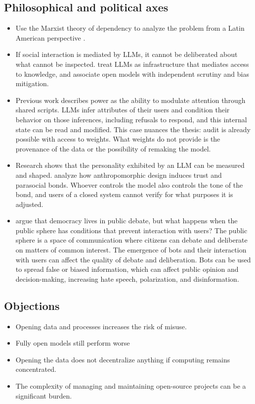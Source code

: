 \documentclass{article}
\begin{document}
\subsection{Philosophical and political axes}
\begin{itemize}
\item Use the Marxist theory of dependency to analyze the problem from a Latin American perspective \textcite{reyes2025pattern}.
\item If social interaction is mediated by LLMs, it cannot be deliberated about what cannot be inspected. \textcite{manchanda2026open} treat LLMs as infrastructure that mediates access to knowledge, and \textcite{machado2025toward} associate open models with independent scrutiny and bias mitigation.
\item Previous work describes power as the ability to modulate attention through shared scripts. LLMs infer attributes of their users and condition their behavior on those inferences, including refusals to respond, and this internal state can be read and modified. This case nuances the thesis: audit is already possible with access to weights. What weights do not provide is the provenance of the data or the possibility of remaking the model.
\item Research shows that the personality exhibited by an LLM can be measured and shaped. \textcite{maeda2024human} analyze how anthropomorphic design induces trust and parasocial bonds. Whoever controls the model also controls the tone of the bond, and users of a closed system cannot verify for what purposes it is adjusted.
\item \textcite{habermas2022neuer} argue that democracy lives in public debate, but what happens when the public sphere has conditions that prevent interaction with users? The public sphere is a space of communication where citizens can debate and deliberate on matters of common interest. The emergence of bots and their interaction with users can affect the quality of debate and deliberation. Bots can be used to spread false or biased information, which can affect public opinion and decision-making, increasing hate speech, polarization, and disinformation.
\end{itemize}
\subsection{Objections} 

\begin{itemize}
\item Opening data and processes increases the risk of misuse.
\item Fully open models still perform worse
\item Opening the data does not decentralize anything if computing remains concentrated.
\item The complexity of managing and maintaining open-source projects can be a significant burden.
\end{itemize}
\end{document}

